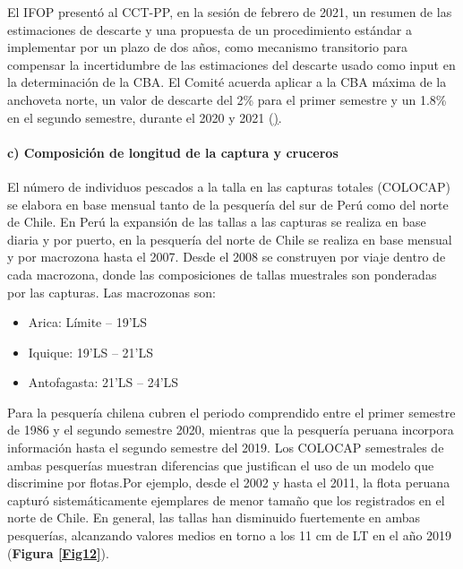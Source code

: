 \documentclass[letter,11pt]{article}
\begin{document}
El IFOP present\'o al CCT-PP, en la sesi\'on de febrero de 2021, un resumen
de las estimaciones de descarte y una propuesta de un procedimiento
est\'andar a implementar por un plazo de dos a\~{n}os, como mecanismo
transitorio para compensar la incertidumbre de las estimaciones del
descarte usado como input en la determinaci\'on de la CBA. El Comit\'e
acuerda aplicar a la CBA m\'axima de la anchoveta norte, un valor de
descarte del 2\% para el primer semestre y un 1.8\% en el segundo
semestre, durante el 2020 y 2021
(\href{http://www.subpesca.cl/portal/616/articles-110238_documento.pdf}).


\paragraph{c) Composici\'on de longitud de la captura y cruceros}

\quad

El n\'umero de individuos pescados a la talla en las capturas totales
(COLOCAP) se elabora en base mensual tanto de la pesquer\'ia del sur de
Per\'u como del norte de Chile. En Per\'u la expansi\'on de las tallas a las
capturas se realiza en base diaria y por puerto, en la pesquer\'ia del
norte de Chile se realiza en base mensual y por macrozona hasta el 2007.
Desde el 2008 se construyen por viaje dentro de cada macrozona, donde
las composiciones de tallas muestrales son ponderadas por las capturas.
Las macrozonas son:

\begin{itemize}
\item
  Arica: L\'imite -- 19'LS
\item
  Iquique: 19'LS -- 21'LS
\item
  Antofagasta: 21'LS -- 24'LS
\end{itemize}

Para la pesquer\'ia chilena cubren el periodo comprendido entre el primer
semestre de 1986 y el segundo semestre 2020, mientras que la pesquer\'ia
peruana incorpora informaci\'on hasta el segundo semestre del 2019. Los
COLOCAP semestrales de ambas pesquer\'ias muestran diferencias que
justifican el uso de un modelo que discrimine por flotas.Por ejemplo,
desde el 2002 y hasta el 2011, la flota peruana captur\'o sistem\'aticamente
ejemplares de menor tama\~{n}o que los registrados en el norte de Chile. En
general, las tallas han disminuido fuertemente en ambas pesquer\'ias,
alcanzando valores medios en torno a los 11 cm de LT en el a\~{n}o 2019
(\textbf{Figura \ref{Fig12}}).
\end{document}
